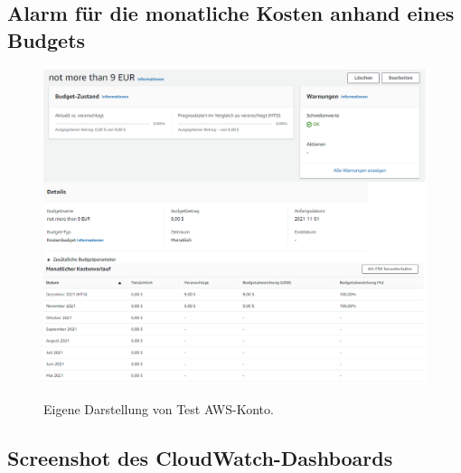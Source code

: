 \subsection{Alarm für die monatliche Kosten anhand eines Budgets}\label{sec_Ang_B}
\begin{figure}[h!]
    \centering
    \includegraphics[scale=0.5]{sources/BudgetAlarm}
    \caption[Budgetalarm]{}
    \label{fig:CloudWatchDashboardTest} 
    Eigene Darstellung von Test AWS-Konto.
  \end{figure}

  \subsection{Screenshot des CloudWatch-Dashboards}\label{sec_Ang_C}
